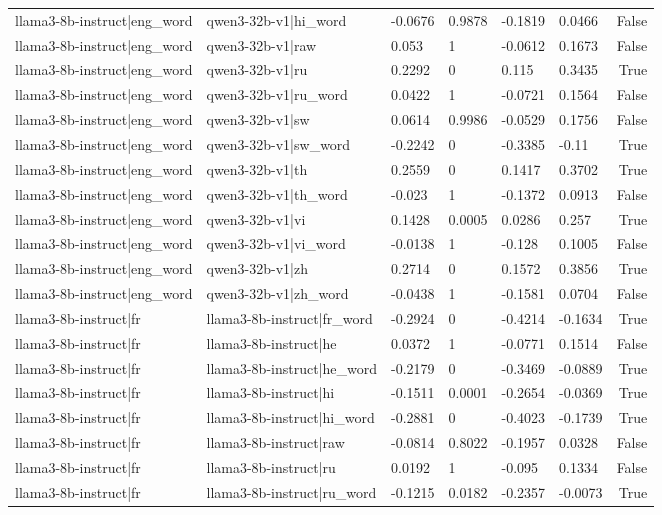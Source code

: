 \begin{table}
\begin{tabular}{llllllr}
llama3-8b-instruct|eng_word & qwen3-32b-v1|hi_word & -0.0676 & 0.9878 & -0.1819 & 0.0466 & False \\
llama3-8b-instruct|eng_word & qwen3-32b-v1|raw & 0.053 & 1 & -0.0612 & 0.1673 & False \\
llama3-8b-instruct|eng_word & qwen3-32b-v1|ru & 0.2292 & 0 & 0.115 & 0.3435 & True \\
llama3-8b-instruct|eng_word & qwen3-32b-v1|ru_word & 0.0422 & 1 & -0.0721 & 0.1564 & False \\
llama3-8b-instruct|eng_word & qwen3-32b-v1|sw & 0.0614 & 0.9986 & -0.0529 & 0.1756 & False \\
llama3-8b-instruct|eng_word & qwen3-32b-v1|sw_word & -0.2242 & 0 & -0.3385 & -0.11 & True \\
llama3-8b-instruct|eng_word & qwen3-32b-v1|th & 0.2559 & 0 & 0.1417 & 0.3702 & True \\
llama3-8b-instruct|eng_word & qwen3-32b-v1|th_word & -0.023 & 1 & -0.1372 & 0.0913 & False \\
llama3-8b-instruct|eng_word & qwen3-32b-v1|vi & 0.1428 & 0.0005 & 0.0286 & 0.257 & True \\
llama3-8b-instruct|eng_word & qwen3-32b-v1|vi_word & -0.0138 & 1 & -0.128 & 0.1005 & False \\
llama3-8b-instruct|eng_word & qwen3-32b-v1|zh & 0.2714 & 0 & 0.1572 & 0.3856 & True \\
llama3-8b-instruct|eng_word & qwen3-32b-v1|zh_word & -0.0438 & 1 & -0.1581 & 0.0704 & False \\
llama3-8b-instruct|fr & llama3-8b-instruct|fr_word & -0.2924 & 0 & -0.4214 & -0.1634 & True \\
llama3-8b-instruct|fr & llama3-8b-instruct|he & 0.0372 & 1 & -0.0771 & 0.1514 & False \\
llama3-8b-instruct|fr & llama3-8b-instruct|he_word & -0.2179 & 0 & -0.3469 & -0.0889 & True \\
llama3-8b-instruct|fr & llama3-8b-instruct|hi & -0.1511 & 0.0001 & -0.2654 & -0.0369 & True \\
llama3-8b-instruct|fr & llama3-8b-instruct|hi_word & -0.2881 & 0 & -0.4023 & -0.1739 & True \\
llama3-8b-instruct|fr & llama3-8b-instruct|raw & -0.0814 & 0.8022 & -0.1957 & 0.0328 & False \\
llama3-8b-instruct|fr & llama3-8b-instruct|ru & 0.0192 & 1 & -0.095 & 0.1334 & False \\
llama3-8b-instruct|fr & llama3-8b-instruct|ru_word & -0.1215 & 0.0182 & -0.2357 & -0.0073 & True \\

\end{tabular}
\end{table}
